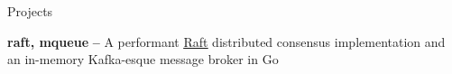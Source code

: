 \documentclass{resume} %
\begin{document}
\begin{rSection}{Projects}
  
  \begin{rProjectSection}
    \item \textbf {raft, mqueue} {\textbf{--}} A performant
      \href{https://raft.github.io/raft.pdf}{\underline{Raft}} distributed
      consensus implementation and an in-memory Kafka-esque message broker in Go
  \end{rProjectSection}

 
\end{rSection}
\end{document}

